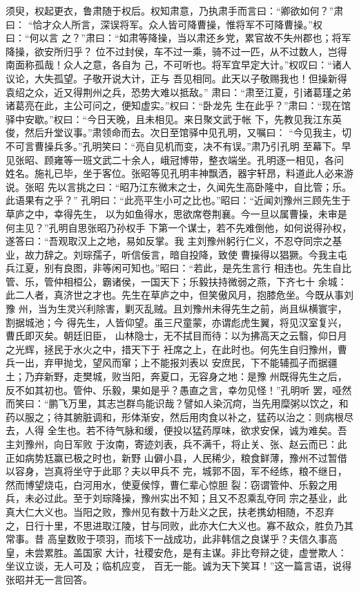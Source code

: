 须臾，权起更衣，鲁肃随于权后。权知肃意，乃执肃手而言曰：“卿欲如何？”肃曰：
“恰才众人所言，深误将军。众人皆可降曹操，惟将军不可降曹操。”权曰：“何以言
之？”肃曰：“如肃等降操，当以肃还乡党，累官故不失州郡也；将军降操，欲安所归乎？
位不过封侯，车不过一乘，骑不过一匹，从不过数人，岂得南面称孤哉！众人之意，各自为
己，不可听也。将军宜早定大计。”权叹曰：“诸人议论，大失孤望。子敬开说大计，正与
吾见相同。此天以子敬赐我也！但操新得袁绍之众，近又得荆州之兵，恐势大难以抵敌。”
肃曰：“肃至江夏，引诸葛瑾之弟诸葛亮在此，主公可问之，便知虚实。”权曰：“卧龙先
生在此乎？”肃曰：“现在馆驿中安歇。”权曰：“今日天晚，且未相见。来日聚文武于帐
下，先教见我江东英俊，然后升堂议事。”肃领命而去。次日至馆驿中见孔明，又嘱曰：
“今见我主，切不可言曹操兵多。”孔明笑曰：“亮自见机而变，决不有误。”肃乃引孔明
至幕下。早见张昭、顾雍等一班文武二十余人，峨冠博带，整衣端坐。孔明逐一相见，各问
姓名。施礼已毕，坐于客位。张昭等见孔明丰神飘洒，器宇轩昂，料道此人必来游说。张昭
先以言挑之曰：“昭乃江东微末之士，久闻先生高卧隆中，自比管；乐。此语果有之乎？”
孔明曰：“此亮平生小可之比也。”昭曰：“近闻刘豫州三顾先生于草庐之中，幸得先生，
以为如鱼得水，思欲席卷荆襄。今一旦以属曹操，未审是何主见？”孔明自思张昭乃孙权手
下第一个谋士，若不先难倒他，如何说得孙权，遂答曰：“吾观取汉上之地，易如反掌。我
主刘豫州躬行仁义，不忍夺同宗之基业，故力辞之。刘琮孺子，听信佞言，暗自投降，致使
曹操得以猖獗。今我主屯兵江夏，别有良图，非等闲可知也。”昭曰：“若此，是先生言行
相违也。先生自比管、乐，管仲相桓公，霸诸侯，一国天下；乐毅扶持微弱之燕，下齐七十
余城：此二人者，真济世之才也。先生在草庐之中，但笑傲风月，抱膝危坐。今既从事刘豫
州，当为生灵兴利除害，剿灭乱贼。且刘豫州未得先生之前，尚且纵横寰宇，割据城池；今
得先生，人皆仰望。虽三尺童蒙，亦谓彪虎生翼，将见汉室复兴，曹氏即灭矣。朝廷旧臣，
山林隐士，无不拭目而待：以为拂高天之云翳，仰日月之光辉，拯民于水火之中，措天下于
衽席之上，在此时也。何先生自归豫州，曹兵一出，弃甲抛戈，望风而窜；上不能报刘表以
安庶民，下不能辅孤子而据疆土；乃弃新野，走樊城，败当阳，奔夏口，无容身之地：是豫
州既得先生之后，反不如其初也。管仲、乐毅，果如是乎？愚直之言，幸勿见怪！”孔明听
罢，哑然而笑曰：“鹏飞万里，其志岂群鸟能识哉？譬如人染沉疴，当先用糜粥以饮之，和
药以服之；待其腑脏调和，形体渐安，然后用肉食以补之，猛药以治之：则病根尽去，人得
全生也。若不待气脉和缓，便投以猛药厚味，欲求安保，诚为难矣。吾主刘豫州，向日军败
于汝南，寄迹刘表，兵不满千，将止关、张、赵云而已：此正如病势尪赢已极之时也，新野
山僻小县，人民稀少，粮食鲜薄，豫州不过暂借以容身，岂真将坐守于此耶？夫以甲兵不
完，城郭不固，军不经练，粮不继日，然而博望烧屯，白河用水，使夏侯惇，曹仁辈心惊胆
裂：窃谓管仲、乐毅之用兵，未必过此。至于刘琮降操，豫州实出不知；且又不忍乘乱夺同
宗之基业，此真大仁大义也。当阳之败，豫州见有数十万赴义之民，扶老携幼相随，不忍弃
之，日行十里，不思进取江陵，甘与同败，此亦大仁大义也。寡不敌众，胜负乃其常事。昔
高皇数败于项羽，而垓下一战成功，此非韩信之良谋乎？夫信久事高皇，未尝累胜。盖国家
大计，社稷安危，是有主谋。非比夸辩之徒，虚誉欺人：坐议立谈，无人可及；临机应变，
百无一能。诚为天下笑耳！”这一篇言语，说得张昭并无一言回答。

